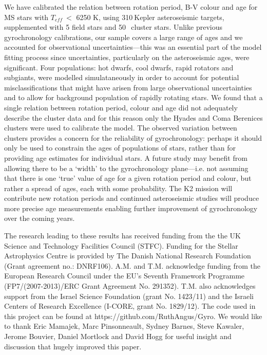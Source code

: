 \documentclass[10pt,preprint]{aastex}
\newcommand{\teff}{$T_{eff}$}
\newcommand{\nastero}{310}
\newcommand{\nHC}{50~}
\begin{document}
We have calibrated the relation between rotation period, B-V colour and age for MS stars with \teff$~<$ 6250 K, using \nastero$~$Kepler asteroseismic targets, supplemented with 5 field stars and \nHC$~$cluster stars.
Unlike previous gyrochronology calibrations, our sample covers a large range of ages and we accounted for observational uncertainties---this was an essential part of the model fitting process since uncertainties, particularly on the asteroseismic ages, were significant.
Four populations: hot dwarfs, cool dwarfs, rapid rotators and subgiants, were modelled simulataneously in order to account for potential misclassifications that might have arisen from large observational uncertainties and to allow for background population of rapidly rotating stars.
We found that a single relation between rotation period, colour and age did not adequately describe the cluster data and for this reason only the Hyades and Coma Berenices clusters were used to calibrate the model.
The observed variation between clusters provides a concern for the reliability of gyrochronology: perhaps it should only be used to constrain the ages of populations of stars, rather than for providing age estimates for individual stars.
A future study may benefit from allowing there to be a `width' to the gyrochronology plane---i.e. not assuming that there is one `true' value of age for a given rotation period and colour, but rather a spread of ages, each with some probability.
The K2 mission will contribute new rotation periods and continued asteroseismic studies will produce more precise age measurements enabling further improvement of gyrochronology over the coming years.

The research leading to these results has received funding from the the UK Science and Technology Facilities Council (STFC).
Funding for the Stellar Astrophysics Centre is provided by The Danish National Research Foundation (Grant agreement no.: DNRF106).
A.M. and T.M. acknowledge funding from the European Research Council under the EU’s Seventh Framework Programme (FP7/(2007-2013)/ERC Grant Agreement No. 291352). T.M. also acknowledges support from the Israel Science Foundation (grant No. 1423/11) and the Israeli Centers of Research Excellence (I-CORE, grant No. 1829/12).
The code used in this project can be found at https://github.com/RuthAngus/Gyro.
We would like to thank Eric Mamajek, Marc Pinsonneault, Sydney Barnes, Steve Kawaler, Jerome Bouvier, Daniel Mortlock and David Hogg for useful insight and discussion that hugely improved this paper.
\end{document}
